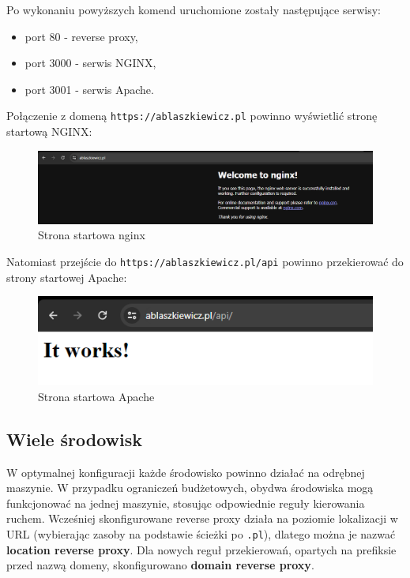 \documentclass{article}
\begin{document}
Po wykonaniu powyższych komend uruchomione zostały następujące serwisy:

\begin{itemize}
    \item port 80 - reverse proxy,
    \item port 3000 - serwis NGINX,
    \item port 3001 - serwis Apache.
\end{itemize}

Połączenie z domeną \lstinline|https://ablaszkiewicz.pl| powinno wyświetlić stronę startową NGINX:

\begin{figure}[H]
    \centering
    \includegraphics[width=1\linewidth]{reverseProxyNginx.png}
    \caption{Strona startowa nginx}
    \label{fig:enter-label}
\end{figure}

Natomiast przejście do \lstinline|https://ablaszkiewicz.pl/api| powinno przekierować do strony startowej Apache:

\begin{figure}[H]
    \centering
    \includegraphics[width=1\linewidth]{reverseProxyApache.png}
    \caption{Strona startowa Apache}
    \label{fig:enter-label}
\end{figure}

\subsection{Wiele środowisk}

W optymalnej konfiguracji każde środowisko powinno działać na odrębnej maszynie. W przypadku ograniczeń budżetowych, obydwa środowiska mogą funkcjonować na jednej maszynie, stosując odpowiednie reguły kierowania ruchem. Wcześniej skonfigurowane reverse proxy działa na poziomie lokalizacji w URL (wybierając zasoby na podstawie ścieżki po \lstinline|.pl|), dlatego można je nazwać \textbf{location reverse proxy}. Dla nowych reguł przekierowań, opartych na prefiksie przed nazwą domeny, skonfigurowano \textbf{domain reverse proxy}.
\end{document}
